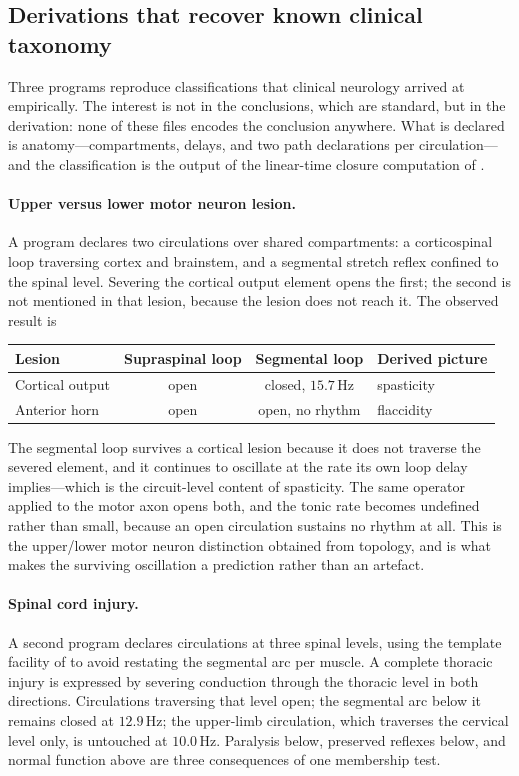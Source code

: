 \documentclass[11pt,twocolumn,a4paper]{article}
\theoremstyle{thmstyle}
\theoremstyle{definition}
\theoremstyle{remark}
\begin{document}
\subsection{Derivations that recover known clinical taxonomy}

Three programs reproduce classifications that clinical neurology arrived at
empirically. The interest is not in the conclusions, which are standard, but
in the derivation: none of these files encodes the conclusion anywhere. What
is declared is anatomy---compartments, delays, and two path declarations per
circulation---and the classification is the output of the linear-time
closure computation of .

\paragraph{Upper versus lower motor neuron lesion.}
A program declares two circulations over shared compartments: a
corticospinal loop traversing cortex and brainstem, and a segmental stretch
reflex confined to the spinal level. Severing the cortical output element
opens the first; the second is not mentioned in that lesion, because the
lesion does not reach it. The observed result is

\begin{center}
\begin{tabular}{@{}lccl@{}}
\toprule
Lesion & Supraspinal loop & Segmental loop & Derived picture\\
\midrule
Cortical output & open & closed, $15.7$\,Hz & spasticity\\
Anterior horn   & open & open, no rhythm    & flaccidity\\
\bottomrule
\end{tabular}
\end{center}

The segmental loop survives a cortical lesion because it does not traverse
the severed element, and it continues to oscillate at the rate its own loop
delay implies---which is the circuit-level content of spasticity. The same
operator applied to the motor axon opens both, and the tonic rate becomes
undefined rather than small, because an open circulation sustains no rhythm
at all. This is the upper/lower motor neuron distinction obtained from
topology, and  is what makes the surviving oscillation a
prediction rather than an artefact.

\paragraph{Spinal cord injury.}
A second program declares circulations at three spinal levels, using the
template facility of  to avoid restating the segmental
arc per muscle. A complete thoracic injury is expressed by severing
conduction through the thoracic level in both directions. Circulations
traversing that level open; the segmental arc below it remains closed at
$12.9$\,Hz; the upper-limb circulation, which traverses the cervical level
only, is untouched at $10.0$\,Hz. Paralysis below, preserved reflexes below,
and normal function above are three consequences of one membership test.
\end{document}
